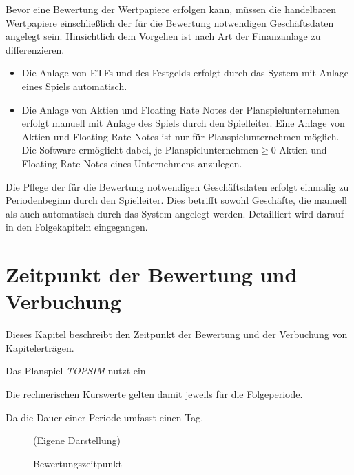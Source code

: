 \documentclass[12pt, a4paper]{article}
\begin{document}
Bevor eine Bewertung der Wertpapiere erfolgen kann, müssen die handelbaren Wertpapiere einschließlich der für die Bewertung notwendigen Geschäftsdaten angelegt sein. Hinsichtlich dem Vorgehen ist nach Art der Finanzanlage zu differenzieren.
\begin{itemize}
	\item Die Anlage von {ETFs} und des Festgelds erfolgt durch das System mit Anlage eines Spiels automatisch. 
	\item Die Anlage von Aktien und Floating Rate Notes der Planspielunternehmen erfolgt manuell mit Anlage des Spiels durch den Spielleiter. Eine Anlage von Aktien und Floating Rate Notes ist nur für Planspielunternehmen möglich. Die Software ermöglicht dabei, je Planspielunternehmen$\geq 0$ Aktien und Floating Rate Notes eines Unternehmens anzulegen. 
\end{itemize}
Die Pflege der für die Bewertung notwendigen Geschäftsdaten erfolgt einmalig zu Periodenbeginn durch den Spielleiter. Dies betrifft sowohl Geschäfte, die manuell als auch automatisch durch das System angelegt werden. Detailliert wird darauf in den Folgekapiteln eingegangen.

\section{Zeitpunkt der Bewertung und Verbuchung}
\label{sec:zeitpunkt_und_durchfuehrung_der_bewertung_buchung}

Dieses Kapitel beschreibt den Zeitpunkt der Bewertung und der Verbuchung von Kapitelerträgen.

Das Planspiel \textit{TOPSIM} nutzt ein  

Die rechnerischen Kurswerte gelten damit jeweils für die Folgeperiode.


Da die Dauer einer Periode umfasst einen Tag. 

\begin{figure}[htb]
	\centering
	\caption{Bewertungszeitpunkt}
	\label{img:zeitstrahl_pewertung}
	(Eigene Darstellung)
\end{figure}
\end{document}
